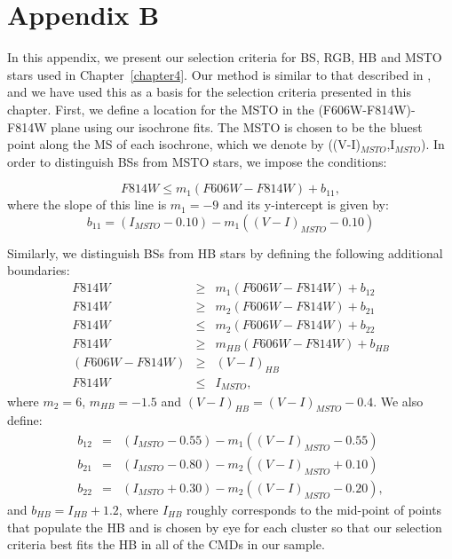 \pagestyle{fancy}
\headheight 20pt
\chead{}
\lfoot{}
\cfoot{\thepage}
\rfoot{}
\renewcommand{\headrulewidth}{0.1pt}
\renewcommand{\footrulewidth}{0.1pt}

\chapter{Appendix B} \label{Appendix-B}
\thispagestyle{fancy}

In this appendix, we present our selection criteria for BS, RGB, HB
and MSTO stars used in Chapter~\ref{chapter4}.  Our method is similar
to that described in \citet{leigh07},
and we have used this as a basis for the selection criteria presented
in this chapter.  First, we define a location for the MSTO in the
(F606W-F814W)-F814W plane using our isochrone fits.  The MSTO is
chosen to be the bluest point along the MS of each isochrone, which we
denote by ((V-I)$_{MSTO}$,I$_{MSTO}$).  In order to distinguish BSs
from MSTO stars, we impose the conditions:

\begin{equation}
\label{eqn:bs_msto1}
F814W \le m_1(F606W-F814W) + b_{11},
\end{equation}
where the slope of this line is $m_1 = -9$ and its y-intercept is
given by:
\begin{equation}
\label{eqn:b_11}
b_{11} = (I_{MSTO}-0.10)-m_1((V-I)_{MSTO}-0.10)
\end{equation}

Similarly, we distinguish BSs from HB stars by defining the following
additional boundaries:
\begin{eqnarray}
\label{bs_hb1}
F814W &\ge& m_1(F606W-F814W) + b_{12} \\
F814W &\ge& m_2(F606W-F814W) + b_{21} \\
F814W &\le& m_2(F606W-F814W) + b_{22} \\
F814W &\ge& m_{HB}(F606W-F814W) + b_{HB} \\
(F606W-F814W) &\ge& (V-I)_{HB} \\
F814W &\le& I_{MSTO},
\end{eqnarray}
where $m_2 = 6$, $m_{HB} = -1.5$ and $(V-I)_{HB} = (V-I)_{MSTO} -
0.4$.  We also define:
\begin{eqnarray}
\label{b_12}
b_{12} &=& (I_{MSTO}-0.55)-m_1((V-I)_{MSTO}-0.55) \\
b_{21} &=& (I_{MSTO}-0.80)-m_2((V-I)_{MSTO}+0.10) \\
b_{22} &=& (I_{MSTO}+0.30)-m_2((V-I)_{MSTO}-0.20),
\end{eqnarray}
and $b_{HB} = I_{HB} + 1.2$, where $I_{HB}$ roughly corresponds to the
mid-point of points that populate the HB and is chosen
by eye for each cluster so that our selection criteria best fits the
HB in all of the CMDs in our sample.

